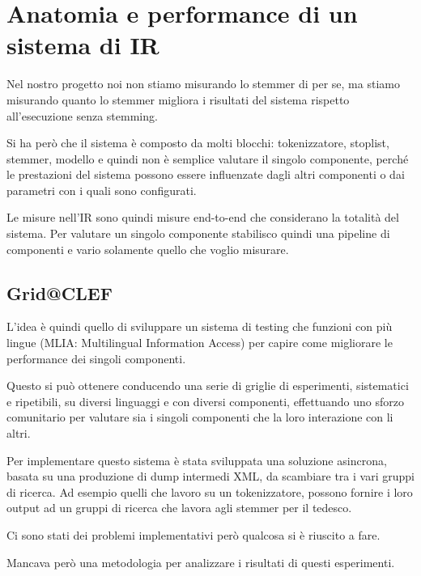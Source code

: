 
\chapter{Anatomia e performance di un sistema di IR}

Nel nostro progetto noi non stiamo misurando lo stemmer di per se, ma stiamo misurando quanto lo stemmer migliora i risultati del sistema rispetto all'esecuzione senza stemming.

Si ha però che il sistema è composto da molti blocchi: tokenizzatore, stoplist, stemmer, modello e quindi non è semplice valutare il singolo componente, perché le prestazioni del sistema possono essere influenzate dagli altri componenti o dai parametri con i quali sono configurati.

Le misure nell'IR sono quindi misure end-to-end che considerano la totalità del sistema. Per valutare un singolo componente stabilisco quindi una pipeline di componenti e vario solamente quello che voglio misurare.

\section{Grid@CLEF}

L'idea è quindi quello di sviluppare un sistema di testing che funzioni con più lingue (MLIA: Multilingual Information Access) per capire come migliorare le performance dei singoli componenti.

Questo si può ottenere conducendo una serie di griglie di esperimenti, sistematici e ripetibili, su diversi linguaggi e con diversi componenti, effettuando uno sforzo comunitario per valutare sia i singoli componenti che la loro interazione con li altri.

Per implementare questo sistema è stata sviluppata una soluzione asincrona, basata su una produzione di dump intermedi XML, da scambiare tra i vari gruppi di ricerca. Ad esempio quelli che lavoro su un tokenizzatore, possono fornire i loro output ad un gruppi di ricerca che lavora agli stemmer per il tedesco.

Ci sono stati dei problemi implementativi però qualcosa si è riuscito a fare.

Mancava però una metodologia per analizzare i risultati di questi esperimenti.


